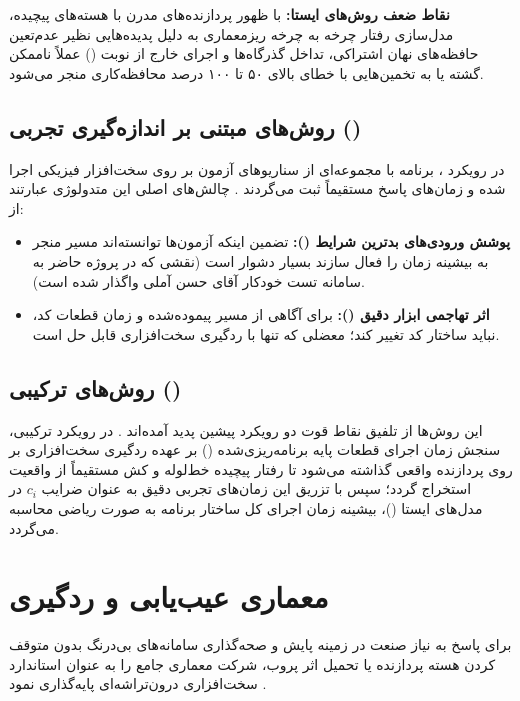 \textbf{نقاط ضعف روش‌های ایستا:} با ظهور پردازنده‌های مدرن با هسته‌های پیچیده، مدل‌سازی رفتار چرخه به چرخه ریزمعماری به دلیل پدیده‌هایی نظیر عدم‌تعین حافظه‌های نهان اشتراکی، تداخل گذرگاه‌ها و اجرای خارج از نوبت () عملاً ناممکن گشته یا به تخمین‌هایی با خطای بالای ۵۰ تا ۱۰۰ درصد محافظه‌کاری منجر می‌شود.

\subsection{روش‌های مبتنی بر اندازه‌گیری تجربی ()}
در رویکرد ، برنامه با مجموعه‌ای از سناریوهای آزمون بر روی سخت‌افزار فیزیکی اجرا شده و زمان‌های پاسخ مستقیماً ثبت می‌گردند \cite{bernat2002wcet}. چالش‌های اصلی این متدولوژی عبارتند از:
\begin{itemize}
    \item \textbf{پوشش ورودی‌های بدترین شرایط ():} تضمین اینکه آزمون‌ها توانسته‌اند مسیر منجر به بیشینه زمان را فعال سازند بسیار دشوار است (نقشی که در پروژه حاضر به سامانه تست خودکار آقای حسن آملی واگذار شده است).
    \item \textbf{اثر تهاجمی ابزار دقیق ():} برای آگاهی از مسیر پیموده‌شده و زمان قطعات کد، نباید ساختار کد تغییر کند؛ معضلی که تنها با ردگیری سخت‌افزاری قابل حل است.
\end{itemize}

\subsection{روش‌های ترکیبی ()}
این روش‌ها از تلفیق نقاط قوت دو رویکرد پیشین پدید آمده‌اند \cite{betts2010hybrid}. در رویکرد ترکیبی، سنجش زمان اجرای قطعات پایه برنامه‌ریزی‌شده () بر عهده ردگیری سخت‌افزاری بر روی پردازنده واقعی گذاشته می‌شود تا رفتار پیچیده خط‌لوله و کش مستقیماً از واقعیت استخراج گردد؛ سپس با تزریق این زمان‌های تجربی دقیق به عنوان ضرایب $c_i$ در مدل‌های ایستا ()، بیشینه زمان اجرای کل ساختار برنامه به صورت ریاضی محاسبه می‌گردد.

\section{معماری عیب‌یابی و ردگیری }
برای پاسخ به نیاز صنعت در زمینه پایش و صحه‌گذاری سامانه‌های بی‌درنگ بدون متوقف کردن هسته پردازنده یا تحمیل اثر پروب، شرکت  معماری جامع \textbf{} را به عنوان استاندارد سخت‌افزاری درون‌تراشه‌ای پایه‌گذاری نمود \cite{armcoresight2013}. 

